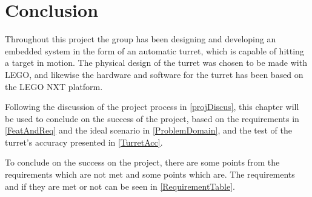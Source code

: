\chapter{Conclusion}\label{FinalConclusion}
Throughout this project the group has been designing and developing an embedded
system in the form of an automatic turret, which is capable of hitting a target
in motion. The physical design of the turret was chosen to be made with LEGO,
and likewise the hardware and software for the turret has been based on the LEGO
NXT platform.\nl

Following the discussion of the project process in \autoref{projDiscus}, this
chapter will be used to conclude on the success of the project, based on the
requirements in \autoref{FeatAndReq} and the ideal scenario in \autoref{ProblemDomain},
and the test of the turret's accuracy presented in \autoref{TurretAcc}. \nl

To conclude on the success on the project, there are some points from the
requirements which are not met and some points which are. The requirements and
if they are met or not can be seen in \autoref{RequirementTable}.

